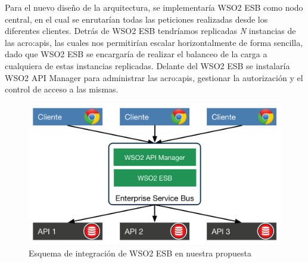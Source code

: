 Para el nuevo diseño de la arquitectura, se implementaría WSO2 ESB como nodo central, en el cual se enrutarían todas las peticiones realizadas desde los diferentes clientes.  Detrás de WSO2 ESB tendríamos replicadas \textit{N} instancias de las \glspl{acro:api}, las cuales nos permitirían escalar horizontalmente de forma sencilla, dado que WSO2 ESB se encargaría de realizar el balanceo de la carga a cualquiera de estas instancias replicadas.  Delante del WSO2 ESB se instalaría WSO2 API Manager para administrar las \glspl{acro:api}, gestionar la autorización y el control de acceso a las mismas.

\begin{figure}[H]
  \includegraphics[width=\linewidth]{src/images/03-capitulo-3/tecnologias/wso2/wso2-esb-integracion-arquitectura.png}
  \caption{Esquema de integración de WSO2 ESB en nuestra propuesta}
  \label{fig:integracion-wso2-esb-arquitectura}
\end{figure}
